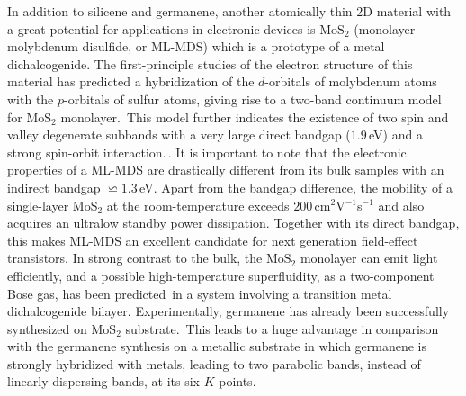 \documentclass[aps,prb,showpacs]{revtex4}
\begin{document}
In addition to silicene and germanene, another atomically thin 2D material with a great potential for applications in electronic devices
is $\mathrm{MoS}_{2}$ (monolayer molybdenum disulfide, or ML-MDS) which is a prototype of a metal dichalcogenide. The first-principle 
studies of the electron structure of this material has predicted a hybridization of the $d$-orbitals of molybdenum atoms with the $p$-orbitals of sulfur atoms,
giving rise to a two-band continuum model for  $\mathrm{MoS}_{2}$ monolayer.\,\cite{MoS01,MoS02,MoS03,Hab} This model further indicates the existence of two spin and valley degenerate subbands 
with a very large direct bandgap ($1.9\,$eV) and a strong spin-orbit interaction.\,\cite{xiao-prl,mos2}. It is 
important to note that the electronic properties of a ML-MDS are drastically different from its bulk samples with an indirect bandgap $\backsimeq 1.3\,$eV. 
Apart from the bandgap difference, the mobility of a single-layer $\mathrm{MoS}_{2}$ at 
the room-temperature exceeds $200\,$cm$^2$V$^{-1}$s$^{-1}$ and also acquires an ultralow standby power dissipation. Together with its direct bandgap, this makes 
ML-MDS an excellent candidate for next generation field-effect transistors. In strong contrast to the bulk, the $\mathrm{MoS}_{2}$ monolayer 
can emit light efficiently, and a possible high-temperature superfluidity, as a two-component Bose gas, has been predicted\,\cite{Oleg16}
in a system involving a transition metal dichalcogenide bilayer. Experimentally,
germanene has already been successfully synthesized on $\mathrm{MoS}_2$ substrate.\,\cite{R1} This leads to a huge advantage in comparison with the germanene synthesis on a metallic substrate
in which germanene is strongly hybridized with metals, leading to two parabolic bands, instead of linearly dispersing bands, at its six $K$ points.
\medskip
\end{document}
